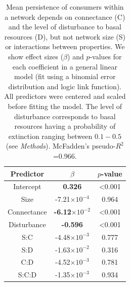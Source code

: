 \documentclass[12pt]{article}
\begin{document}
\begin{spacing}{2.0}


    \begin{table}[hb!]
        \caption{Mean persistence of consumers within a network depends on connectance (C) and the level of disturbance to basal resources (D), but not network size (S) or interactions between properties. We show effect sizes ($\beta$) and $p$-values for each coefficient in a general linear model (fit using a binomial error distribution and logic link function). All predictors were centered and scaled before fitting the model. The level of disturbance corresponds to basal resources having a probability of extinction ranging between $0.1 - 0.5$ (see \emph{Methods}). McFadden's pseudo-$R^2$=0.966.
        }
        \label{tab:per_vs_SC}
        \centering
        \begin{tabular}{c|c c |}
            Predictor & $\beta$ & $p$-value \\
            \hline
            Intercept & \textbf{0.326} & \textless0.001 \\
            Size & -7.21$\times10^{-4}$  & 0.964 \\
            Connectance & \textbf{-6.12$\times10^{-2}$}& \textless0.001 \\
            Disturbance & \textbf{-0.596} & \textless0.001 \\
            S:C & -4.48$\times10^{-3}$ & 0.777 \\
            S:D & -1.63$\times10^{-2}$ & 0.316 \\
            C:D & -4.52$\times10^{-3}$ & 0.781 \\
            S:C:D & -1.35$\times10^{-3}$ & 0.934 \\
        \end{tabular}
    \end{table}


\end{spacing}
\end{document}
